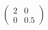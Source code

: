 \documentclass[preview]{standalone}
\begin{document}
\begin{align*}
\begin{pmatrix} 2 & 0\\ 0 & 0.5 \end{pmatrix}
\end{align*}
\end{document}
